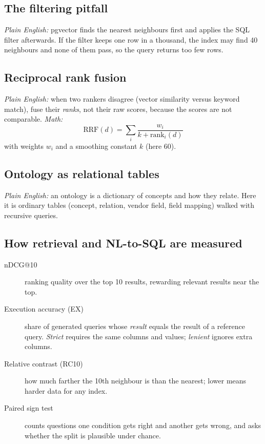 \documentclass[11pt,a4paper]{article}
\begin{document}
\subsection{The filtering pitfall}
\emph{Plain English:} pgvector finds the nearest neighbours first and applies the SQL filter afterwards. If the filter keeps one row in a thousand, the index may find 40 neighbours and none of them pass, so the query returns too few rows.

\subsection{Reciprocal rank fusion}
\emph{Plain English:} when two rankers disagree (vector similarity versus keyword match), fuse their \emph{ranks}, not their raw scores, because the scores are not comparable. \emph{Math:}
\[ \text{RRF}(d)=\sum_{i} \frac{w_i}{k+\text{rank}_i(d)} \]
with weights $w_i$ and a smoothing constant $k$ (here 60).

\subsection{Ontology as relational tables}
\emph{Plain English:} an ontology is a dictionary of concepts and how they relate. Here it is ordinary tables (concept, relation, vendor field, field mapping) walked with recursive queries.

\subsection{How retrieval and NL-to-SQL are measured}
\begin{description}
  \item[nDCG@10] ranking quality over the top 10 results, rewarding relevant results near the top.
  \item[Execution accuracy (EX)] share of generated queries whose \emph{result} equals the result of a reference query. \emph{Strict} requires the same columns and values; \emph{lenient} ignores extra columns.
  \item[Relative contrast (RC10)] how much farther the 10th neighbour is than the nearest; lower means harder data for any index.
  \item[Paired sign test] counts questions one condition gets right and another gets wrong, and asks whether the split is plausible under chance.
\end{description}

\end{document}
